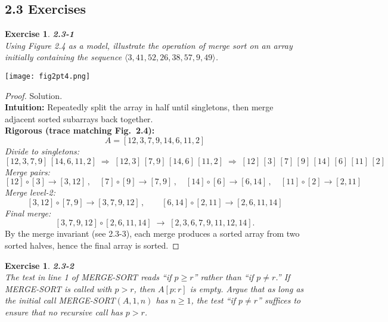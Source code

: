 \documentclass[12pt]{article}
\newtheorem{exercise}[theorem]{Exercise}
\theoremstyle{definition}
\begin{document}
\dotfill
\newpage

\subsection*{2.3 Exercises}

\begin{exercise}
\noindent
\textbf{2.3-1}\\
\noindent
Using Figure 2.4 as a model, illustrate the operation of merge sort on an
array initially containing the sequence $\langle 3, 41, 52, 26, 38, 57, 9, 49 \rangle$.
\end{exercise}

\begin{center}
    \texttt{[image: fig2pt4.png]}
\end{center}

\vspace{1pt}

\begin{proof}
Solution.\\

\noindent
\textbf{Intuition:} Repeatedly split the array in half until singletons, then
merge adjacent sorted subarrays back together.\\

\noindent
\textbf{Rigorous (trace matching Fig.\ 2.4):}
\[
A=[12,3,7,9,14,6,11,2]
\]
\emph{Divide to singletons:}
\[
[12,3,7,9]\,[14,6,11,2] \;\Rightarrow\; [12,3]\,[7,9]\,[14,6]\,[11,2]
\;\Rightarrow\; [12]\,[3]\,[7]\,[9]\,[14]\,[6]\,[11]\,[2]
\]
\emph{Merge pairs:}
\[
[12]\circ[3]\!\to\![3,12]\,,\quad [7]\circ[9]\!\to\![7,9]\,,\quad
[14]\circ[6]\!\to\![6,14]\,,\quad [11]\circ[2]\!\to\![2,11]
\]
\emph{Merge level-2:}
\[
[3,12]\circ[7,9]\!\to\![3,7,9,12]\,,\qquad
[6,14]\circ[2,11]\!\to\![2,6,11,14]
\]
\emph{Final merge:}
\[
[3,7,9,12]\circ[2,6,11,14]\;\to\;[2,3,6,7,9,11,12,14].
\]
By the merge invariant (see 2.3-3), each merge produces a sorted array from
two sorted halves, hence the final array is sorted.
\end{proof}

\newpage

\begin{exercise}
\noindent
\textbf{2.3-2}\\
\noindent
The test in line 1 of \textsc{MERGE-SORT} reads “if $p \ge r$” rather than “if $p \ne r$.”
If \textsc{MERGE-SORT} is called with $p>r$, then $A[p:r]$ is empty. Argue that
as long as the initial call \textsc{MERGE-SORT}$(A,1,n)$ has $n\ge1$, the test
“if $p \ne r$” suffices to ensure that no recursive call has $p>r$.
\end{exercise}
\end{document}
